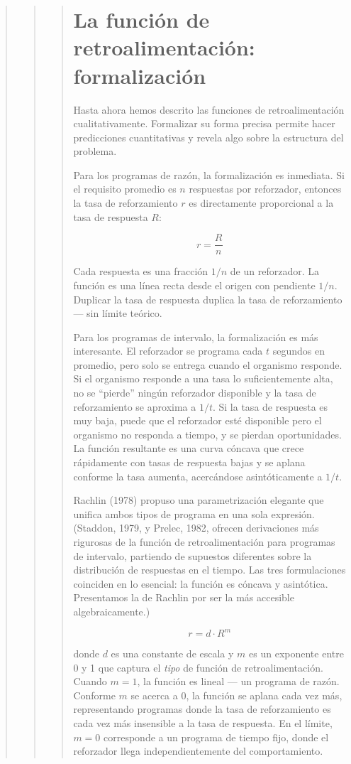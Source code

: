 \documentclass[
  letterpaper,
  DIV=11,
  numbers=noendperiod]{scrreprt}
\begin{document}
\begin{tcolorbox}[enhanced jigsaw, toprule=.15mm, arc=.35mm, colback=white, opacityback=0, colframe=quarto-callout-note-color-frame, breakable, rightrule=.15mm, left=2mm, leftrule=.75mm, bottomrule=.15mm]
\begin{quote}
\begin{quote}
\begin{quote}
\section{La función de retroalimentación:
formalización}\label{la-funciuxf3n-de-retroalimentaciuxf3n-formalizaciuxf3n}

Hasta ahora hemos descrito las funciones de retroalimentación
cualitativamente. Formalizar su forma precisa permite hacer predicciones
cuantitativas y revela algo sobre la estructura del problema.

Para los programas de razón, la formalización es inmediata. Si el
requisito promedio es \(n\) respuestas por reforzador, entonces la tasa
de reforzamiento \(r\) es directamente proporcional a la tasa de
respuesta \(R\):

\[r = \frac{R}{n}\]

Cada respuesta es una fracción \(1/n\) de un reforzador. La función es
una línea recta desde el origen con pendiente \(1/n\). Duplicar la tasa
de respuesta duplica la tasa de reforzamiento --- sin límite teórico.

Para los programas de intervalo, la formalización es más interesante. El
reforzador se programa cada \(t\) segundos en promedio, pero solo se
entrega cuando el organismo responde. Si el organismo responde a una
tasa lo suficientemente alta, no se ``pierde'' ningún reforzador
disponible y la tasa de reforzamiento se aproxima a \(1/t\). Si la tasa
de respuesta es muy baja, puede que el reforzador esté disponible pero
el organismo no responda a tiempo, y se pierdan oportunidades. La
función resultante es una curva cóncava que crece rápidamente con tasas
de respuesta bajas y se aplana conforme la tasa aumenta, acercándose
asintóticamente a \(1/t\).

Rachlin (1978) propuso una parametrización elegante que unifica ambos
tipos de programa en una sola expresión. (Staddon, 1979, y Prelec, 1982,
ofrecen derivaciones más rigurosas de la función de retroalimentación
para programas de intervalo, partiendo de supuestos diferentes sobre la
distribución de respuestas en el tiempo. Las tres formulaciones
coinciden en lo esencial: la función es cóncava y asintótica.
Presentamos la de Rachlin por ser la más accesible algebraicamente.)

\[r = d \cdot R^m\]

donde \(d\) es una constante de escala y \(m\) es un exponente entre 0 y
1 que captura el \emph{tipo} de función de retroalimentación. Cuando
\(m = 1\), la función es lineal --- un programa de razón. Conforme \(m\)
se acerca a 0, la función se aplana cada vez más, representando
programas donde la tasa de reforzamiento es cada vez más insensible a la
tasa de respuesta. En el límite, \(m = 0\) corresponde a un programa de
tiempo fijo, donde el reforzador llega independientemente del
comportamiento.


\end{quote}
\end{quote}
\end{quote}
\end{tcolorbox}
\end{document}
